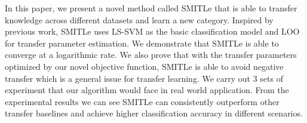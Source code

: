 In this paper, we present a novel method called SMITLe that is able to transfer knowledge across different datasets and learn a new category. Inspired by previous work, SMITLe uses LS-SVM as the basic classification model and LOO for transfer parameter estimation. We demonstrate that SMITLe is able to converge at a logarithmic rate. We also prove that with the transfer parameters optimized by our novel objective function, SMITLe is able to avoid negative transfer which is a general issue for transfer learning. 
We carry out 3 sets of experiment that our algorithm would face in real world application. 
From the experimental results we can see SMITLe can consistently outperform other transfer baselines and achieve higher classification accuracy in different scenarios.